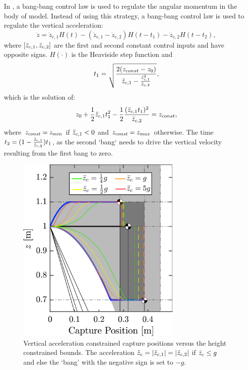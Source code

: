 In \cite{pratt2006capture,stephens2007humanoid,koolen2012capturability}, a bang-bang control law is used to regulate the angular momentum in the body of model. Instead of using this strategy, a bang-bang control law is used to regulate the vertical acceleration:
\begin{equation}
	\ddot{z} = \ddot{z}_{c,1}H(t) - (\ddot{z}_{c,1} - \ddot{z}_{c,2})H(t-t_1) - \ddot{z}_{c,2}H(t-t_2),
\end{equation}
where $[\ddot{z}_{c,1},\ddot{z}_{c,2}]$ are the first and second constant control inputs and have opposite signs. $H(\cdot)$ is the Heaviside step function and 
\begin{equation}
t_1=\sqrt{\frac{2(z_{const}-z_0)}{\ddot{z}_{c,1} - \frac{\ddot{z}_{c,1}^2}{\ddot{z}_{c,2}}}},
\end{equation}
which is the solution of:
\begin{equation}
	z_0+\frac{1}{2}\ddot{z}_{c,1} t_1^2 - \frac{1}{2}\frac{(\ddot{z}_{c,1} t_1)^2}{\ddot{z}_{c,2}}= z_{const},
\end{equation}
where $z_{const}=z_{min}$ if $\ddot{z}_{c,1} <0$ and $z_{const}=z_{max}$ otherwise. The time $t_2=(1-\frac{\ddot{z}_{c,1}}{\ddot{z}_{c,2}})t_1$, as the second `bang` needs to drive the vertical velocity resulting from the first bang to zero. 
\begin{figure}
      \centering
      \includegraphics[width=3.2in]{STYLESTUFF/CPLimitsForce.png}
      \caption{Vertical acceleration constrained capture positions versus the height constrained bounds. The acceleration $\ddot{z}_{c}=|\ddot{z}_{c,1}|=|\ddot{z}_{c,2}|$ if $\ddot{z}_{c} \leq g$ and else the `bang' with the negative sign is set to $-g$.}
      \label{fig:zvsf}
\end{figure}


